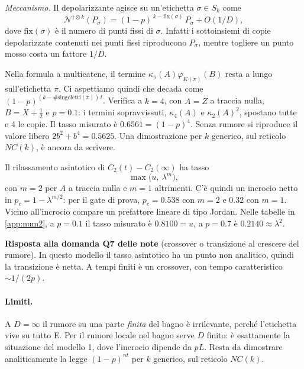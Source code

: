 \noindent \emph{Meccanismo.} Il depolarizzante agisce su un'etichetta $\sigma\in S_k$ come
\[
\mathcal N^{\dagger\otimes k}(P_\sigma)=(1-p)^{\,k-\mathrm{fix}(\sigma)}\,P_\sigma+O(1/D),
\]
dove $\mathrm{fix}(\sigma)$ è il numero di punti fissi di $\sigma$. Infatti i sottoinsiemi di copie depolarizzate contenuti nei punti fissi riproducono $P_\sigma$, mentre togliere un punto mosso costa un fattore $1/D$.

Nella formula a multicatene, il termine $\kappa_\pi(A)\varphi_{K(\pi)}(B)$ resta a lungo sull'etichetta $\pi$. Ci aspettiamo quindi che decada come $(1-p)^{(k-\#\text{singoletti}(\pi))\,t}$. Verifica a $k=4$, con $A=Z$ a traccia nulla, $B=X+\tfrac12$ e $p=0.1$: i termini sopravvissuti, $\kappa_4(A)$ e $\kappa_2(A)^2$, spostano tutte e 4 le copie. Il tasso misurato è $0.6561=(1-p)^4$. Senza rumore si riproduce il valore libero $2b^2+b^4=0.5625$. Una dimostrazione per $k$ generico, sul reticolo $NC(k)$, è ancora da scrivere.

\begin{proposition}\label{prop:cross}
Il rilassamento asintotico di $C_2(t)-C_2(\infty)$ ha tasso
\[
\max\bigl(u,\ \lambda^m\bigr),
\]
con $m=2$ per $A$ a traccia nulla e $m=1$ altrimenti. C'è quindi un incrocio netto in $p_c=1-\lambda^{m/2}$: per il gate di prova, $p_c=0.538$ con $m=2$ e $0.32$ con $m=1$. Vicino all'incrocio compare un prefattore lineare di tipo Jordan. Nelle tabelle in \cref{app:num2}, a $p=0.1$ il tasso misurato è $0.8100=u$, a $p=0.7$ è $0.2140\approx\lambda^2$.
\end{proposition}

\noindent \textbf{Risposta alla domanda Q7 delle note} (crossover o transizione al crescere del rumore). In questo modello il tasso asintotico ha un punto non analitico, quindi la transizione è netta. A tempi finiti è un crossover, con tempo caratteristico $\sim1/(2p)$.

\paragraph{Limiti.} A $D=\infty$ il rumore su una parte \emph{finita} del bagno è irrilevante, perché l'etichetta vive su tutto E. Per il rumore locale nel bagno serve $D$ finito: è esattamente la situazione del modello 1, dove l'incrocio dipende da $pL$. Resta da dimostrare analiticamente la legge $(1-p)^{nt}$ per $k$ generico, sul reticolo $NC(k)$.
